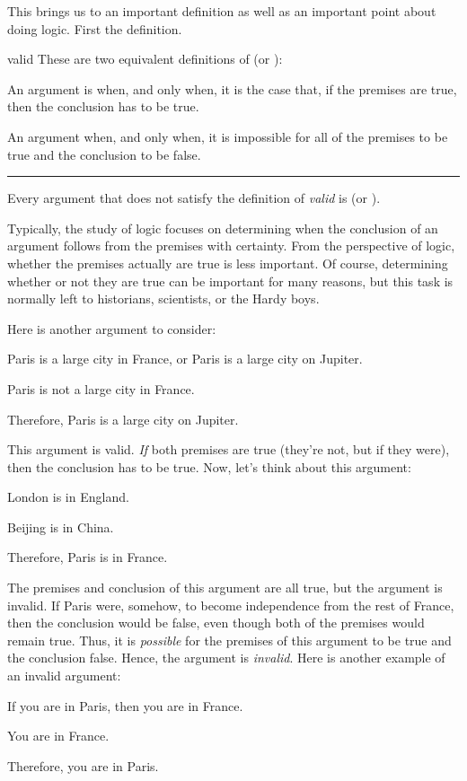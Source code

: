This brings us to an important definition as well as an important point about doing logic. First the definition. 
\begin{factboxy}{valid}
These are two equivalent definitions of  (or ):
\begin{ebullet}
\vspace{-2mm}
\item[1.] An argument is  when, and only when, it is the case that, if the premises are true, then the conclusion has to be true.

\item[2.] An argument  when, and only when, it is impossible for all of the premises to be true and the conclusion to be false.
\end{ebullet}

\hrule
\medskip

Every argument that does not satisfy the definition of \textit{valid} is  (or ).
\end{factboxy}
\noindent Typically, the study of logic focuses on determining when the conclusion of an argument follows from the premises with certainty. From the perspective of logic, whether the premises actually are true is less important. Of course, determining whether or not they are true can be important for many reasons, but this task is normally left to historians, scientists, or the Hardy boys.

Here is another argument to consider:
	\begin{earg}
		\item[1.] Paris is a large city in France, or Paris is a large city on Jupiter.
		\item[2.] Paris is not a large city in France.
		\item[3.] Therefore, Paris is a large city on Jupiter.
	\end{earg}
This argument is valid. \emph{If} both premises are true (they're not, but if they were), then the conclusion has to be true. Now, let's think about this argument:
	\begin{earg}
		\item[1.] London is in England.
		\item[2.] Beijing is in China.
		\item[3.] Therefore, Paris is in France.
	\end{earg}
The premises and conclusion of this argument are all true, but the argument is invalid. If Paris were, somehow, to become independence from the rest of France, then the conclusion would be false, even though both of the premises would remain true. Thus, it is \emph{possible} for the premises of this argument to be true and the conclusion false. Hence, the argument is \textit{invalid}. Here is another example of an invalid argument:
	\begin{earg}
		\item[1.] If you are in Paris, then you are in France.
		\item[2.] You are in France.
		\item[3.] Therefore, you are in Paris.
	\end{earg}

